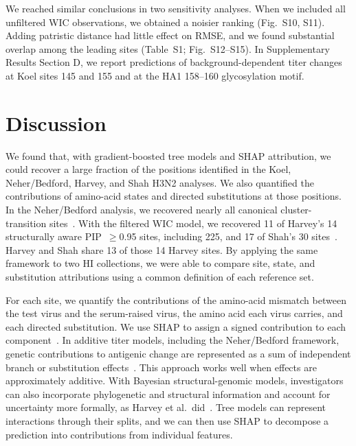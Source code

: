 \documentclass[12pt]{article}
\begin{document}
We reached similar conclusions in two sensitivity analyses. When we included all unfiltered WIC observations, we obtained a noisier ranking (Fig.~S10, S11). Adding patristic distance had little effect on RMSE, and we found substantial overlap among the leading sites (Table~S1; Fig.~S12--S15). In Supplementary Results Section D, we report predictions of background-dependent titer changes at Koel sites 145 and 155 and at the HA1 158--160 glycosylation motif.

\section{Discussion}

We found that, with gradient-boosted tree models and SHAP attribution, we could recover a large fraction of the positions identified in the Koel, Neher/Bedford, Harvey, and Shah H3N2 analyses. We also quantified the contributions of amino-acid states and directed substitutions at those positions. In the Neher/Bedford analysis, we recovered nearly all canonical cluster-transition sites~\cite{Koel2013Science, Neher2016PNAS}. With the filtered WIC model, we recovered 11 of Harvey's 14 structurally aware PIP~$\geq$0.95 sites, including 225, and 17 of Shah's 30 sites~\cite{Harvey2023PLoSComputBiol, shah2024seasonal}. Harvey and Shah share 13 of those 14 Harvey sites. By applying the same framework to two HI collections, we were able to compare site, state, and substitution attributions using a common definition of each reference set.

For each site, we quantify the contributions of the amino-acid mismatch between the test virus and the serum-raised virus, the amino acid each virus carries, and each directed substitution. We use SHAP to assign a signed contribution to each component~\cite{Lundberg2017, Lundberg2020NatMachIntell}. In additive titer models, including the Neher/Bedford framework, genetic contributions to antigenic change are represented as a sum of independent branch or substitution effects~\cite{Neher2016PNAS}. This approach works well when effects are approximately additive. With Bayesian structural-genomic models, investigators can also incorporate phylogenetic and structural information and account for uncertainty more formally, as Harvey et al.\ did~\cite{Harvey2023PLoSComputBiol}. Tree models can represent interactions through their splits, and we can then use SHAP to decompose a prediction into contributions from individual features.
\end{document}
